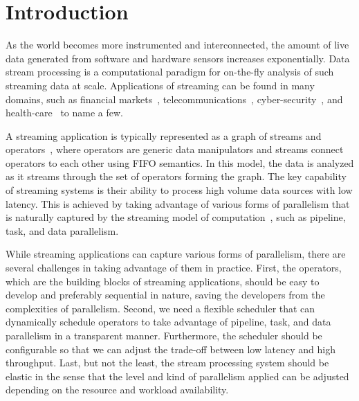 \section{Introduction}\label{sec:introduction}

As the world becomes more instrumented and interconnected, the amount of live
data generated from software and hardware sensors increases exponentially.
Data stream processing is a computational paradigm for on-the-fly analysis of
such streaming data at scale. Applications of streaming can be found in many
domains, such as financial markets~\cite{ref:app-finance},
telecommunications~\cite{ref:app-telco},
cyber-security~\cite{ref:app-cybersecurity}, and
health-care~\cite{ref:app-healthcare} to name a few.

A streaming application is typically represented as a graph of streams and
operators~\cite{ref:spl}, where operators are generic data manipulators and
streams connect operators to each other using FIFO semantics. In this model,
the data is analyzed as it streams through the set of operators forming the
graph. The key capability of streaming systems is their ability to process
high volume data sources with low latency. This is achieved by taking
advantage of various forms of parallelism that is naturally captured by the
streaming model of computation~\cite{ref:survey}, such as pipeline, task, and
data parallelism.

While streaming applications can capture various forms of parallelism, there
are several challenges in taking advantage of them in practice. First, the
operators, which are the building blocks of streaming applications, should be
easy to develop and preferably sequential in nature, saving the developers
from the complexities of parallelism. Second, we need a flexible scheduler
that can dynamically schedule operators to take advantage of pipeline, task,
and data parallelism in a transparent manner. Furthermore, the scheduler
should be configurable so that we can adjust the trade-off between low latency
and high throughput. Last, but not the least, the stream processing system
should be elastic in the sense that the level and kind of parallelism applied
can be adjusted depending on the resource and workload availability.

